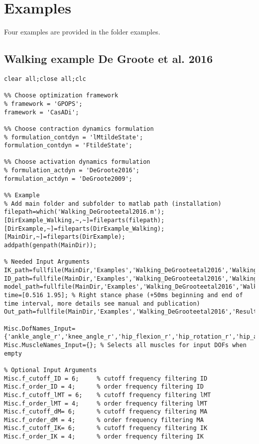 \documentclass[a4paper,oneside,11pt]{article}
\begin{document}
\section{Examples}
\label{Examples}

Four examples are provided in the folder examples.
\subsection{Walking example De Groote et al. 2016}
\begin{lstlisting}[frame=none,basicstyle=\tiny]
clear all;close all;clc

%% Choose optimization framework
% framework = 'GPOPS';
framework = 'CasADi';

%% Choose contraction dynamics formulation
% formulation_contdyn = 'lMtildeState';
formulation_contdyn = 'FtildeState';

%% Choose activation dynamics formulation
% formulation_actdyn = 'DeGroote2016';
formulation_actdyn = 'DeGroote2009';

%% Example
% Add main folder and subfolder to matlab path (installation)
filepath=which('Walking_DeGrooteetal2016.m');
[DirExample_Walking,~,~]=fileparts(filepath); 
[DirExample,~]=fileparts(DirExample_Walking);
[MainDir,~]=fileparts(DirExample);
addpath(genpath(MainDir));

% Needed Input Arguments
IK_path=fullfile(MainDir,'Examples','Walking_DeGrooteetal2016','WalkingData','Walking_IK.mot');
ID_path=fullfile(MainDir,'Examples','Walking_DeGrooteetal2016','WalkingData','Walking_ID.sto');
model_path=fullfile(MainDir,'Examples','Walking_DeGrooteetal2016','WalkingData','subject1.osim');
time=[0.516 1.95]; % Right stance phase (+50ms beginning and end of time interval, more details see manual and publication)
Out_path=fullfile(MainDir,'Examples','Walking_DeGrooteetal2016','Results');

Misc.DofNames_Input={'ankle_angle_r','knee_angle_r','hip_flexion_r','hip_rotation_r','hip_adduction_r'};
Misc.MuscleNames_Input={}; % Selects all muscles for input DOFs when empty

% Optional Input Arguments
Misc.f_cutoff_ID = 6;     % cutoff frequency filtering ID
Misc.f_order_ID = 4;      % order frequency filtering ID
Misc.f_cutoff_lMT = 6;    % cutoff frequency filtering lMT
Misc.f_order_lMT = 4;     % order frequency filtering lMT
Misc.f_cutoff_dM= 6;      % cutoff frequency filtering MA
Misc.f_order_dM = 4;      % order frequency filtering MA
Misc.f_cutoff_IK= 6;      % cutoff frequency filtering IK
Misc.f_order_IK = 4;      % order frequency filtering IK


\end{lstlisting}
\end{document}
